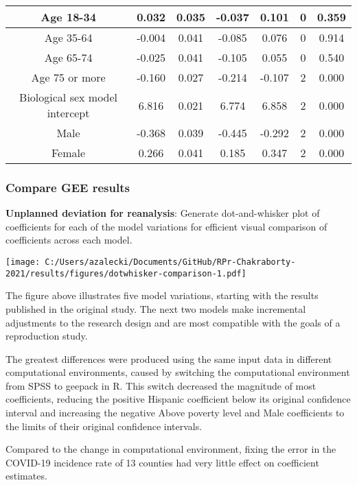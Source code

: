 \documentclass[
]{article}
\begin{document}
\begin{table}
\begin{tabular}[t]{c|c|c|c|c|c|c}
\hline
Age 18-34 & 0.032 & 0.035 & -0.037 & 0.101 & 0 & 0.359\\
\hline
Age 35-64 & -0.004 & 0.041 & -0.085 & 0.076 & 0 & 0.914\\
\hline
Age 65-74 & -0.025 & 0.041 & -0.105 & 0.055 & 0 & 0.540\\
\hline
Age 75 or more & -0.160 & 0.027 & -0.214 & -0.107 & 2 & 0.000\\
\hline
Biological sex model intercept & 6.816 & 0.021 & 6.774 & 6.858 & 2 & 0.000\\
\hline
Male & -0.368 & 0.039 & -0.445 & -0.292 & 2 & 0.000\\
\hline
Female & 0.266 & 0.041 & 0.185 & 0.347 & 2 & 0.000\\
\hline
\end{tabular}
\end{table}

\hypertarget{compare-gee-results}{%
\subsubsection{Compare GEE results}\label{compare-gee-results}}

\textbf{Unplanned deviation for reanalysis}: Generate dot-and-whisker
plot of coefficients for each of the model variations for efficient
visual comparison of coefficients across each model.

\texttt{[image: C:/Users/azalecki/Documents/GitHub/RPr-Chakraborty-2021/results/figures/dotwhisker-comparison-1.pdf]}

The figure above illustrates five model variations, starting with the
results published in the original study. The next two models make
incremental adjustments to the research design and are most compatible
with the goals of a reproduction study.

The greatest differences were produced using the same input data in
different computational environments, caused by switching the
computational environment from SPSS to geepack in R. This switch
decreased the magnitude of most coefficients, reducing the positive
Hispanic coefficient below its original confidence interval and
increasing the negative Above poverty level and Male coefficients to the
limits of their original confidence intervals.

Compared to the change in computational environment, fixing the error in
the COVID-19 incidence rate of 13 counties had very little effect on
coefficient estimates.
\end{document}
